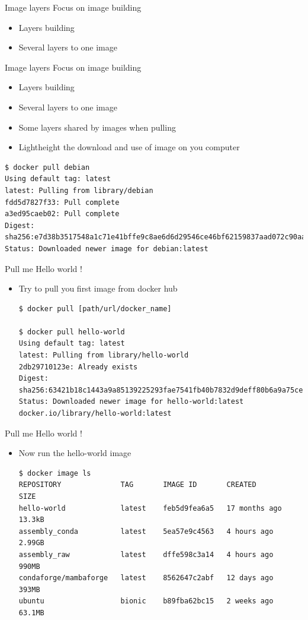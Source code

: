 \begin{frame}[fragile]{Image layers}
Focus on image building
\begin{itemize}[<+->]
\item Layers building
\item Several layers to one image
\end{itemize}
\end{frame}

\begin{frame}[fragile]{Image layers}
Focus on image building
\begin{itemize}
\item Layers building
\item Several layers to one image
\item Some layers shared by images when pulling
\item Lightheight the download and use of image on you computer
\end{itemize}
\begin{verbatim}
$ docker pull debian
Using default tag: latest
latest: Pulling from library/debian
fdd5d7827f33: Pull complete
a3ed95caeb02: Pull complete
Digest: sha256:e7d38b3517548a1c71e41bffe9c8ae6d6d29546ce46bf62159837aad072c90aa
Status: Downloaded newer image for debian:latest
\end{verbatim}
\end{frame}

\begin{frame}[fragile]{Pull me Hello world !}
\begin{itemize}
\item Try to pull you first image from docker hub
\begin{verbatim}
$ docker pull [path/url/docker_name]

$ docker pull hello-world
Using default tag: latest
latest: Pulling from library/hello-world
2db29710123e: Already exists 
Digest: sha256:63421b18c1443a9a85139225293fae7541fb40b7832d9deff80b6a9a75ce3604
Status: Downloaded newer image for hello-world:latest
docker.io/library/hello-world:latest

\end{verbatim}
\end{itemize}
\end{frame}

\begin{frame}[fragile]{Pull me Hello world !}
\begin{itemize}
\item Now run the hello-world image
\begin{verbatim}
$ docker image ls
REPOSITORY              TAG       IMAGE ID       CREATED         SIZE
hello-world             latest    feb5d9fea6a5   17 months ago   13.3kB
assembly_conda          latest    5ea57e9c4563   4 hours ago     2.99GB
assembly_raw            latest    dffe598c3a14   4 hours ago     990MB
condaforge/mambaforge   latest    8562647c2abf   12 days ago     393MB
ubuntu                  bionic    b89fba62bc15   2 weeks ago     63.1MB
\end{verbatim}
\end{itemize}
\end{frame}


